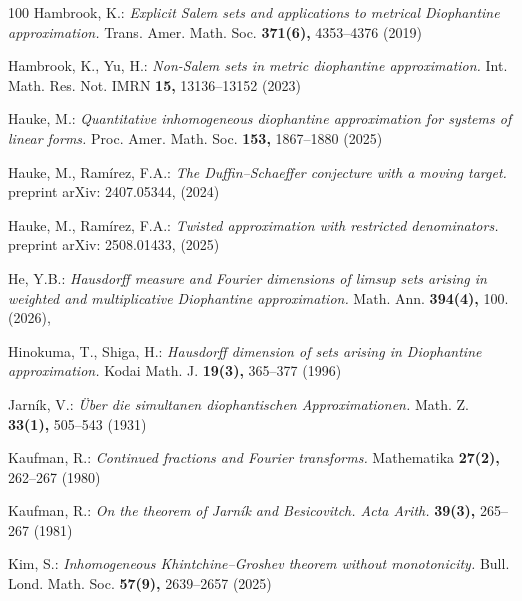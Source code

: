 \documentclass[12pt,a4paper,twoside]{article}
\begin{document}
\begin{thebibliography}{100}
Hambrook, K.:
\textit{Explicit Salem sets and applications to metrical Diophantine approximation.}
Trans. Amer. Math. Soc. {\bf 371(6),} 4353--4376  (2019)


 Hambrook, K.,   Yu, H.:
\textit{Non-Salem sets in metric diophantine approximation.}
Int. Math. Res. Not. IMRN  {\bf 15,} 13136--13152 (2023)


  Hauke, M.:
\textit{Quantitative inhomogeneous diophantine approximation for systems of linear forms.}
Proc. Amer. Math. Soc. {\bf 153,}  1867--1880 (2025)



 Hauke, M.,  Ram\'{i}rez, F.A.:
\textit{The Duffin--Schaeffer conjecture with a moving target.}
 preprint arXiv: 2407.05344, (2024)



 Hauke, M.,  Ram\'{i}rez, F.A.:
\textit{Twisted approximation with restricted denominators.}
  preprint arXiv: 2508.01433,  (2025)



  He, Y.B.:
\textit{Hausdorff measure and Fourier dimensions of limsup sets arising in weighted and multiplicative Diophantine approximation. }
Math. Ann.  {\bf 394(4),}  100. (2026),



 Hinokuma, T.,   Shiga, H.:
\textit{Hausdorff dimension of sets arising in Diophantine approximation.}
Kodai Math. J. {\bf 19(3),}   365--377  (1996)


  Jarn\'{i}k, V.:
\textit{\"{U}ber die simultanen diophantischen Approximationen. }
Math. Z.  {\bf 33(1),}  505--543  (1931)




 Kaufman, R.:
\textit{Continued fractions and Fourier transforms.}
Mathematika  {\bf 27(2),}   262–267   (1980)


Kaufman, R.:
\textit{On the theorem of Jarn\'{i}k and Besicovitch. Acta Arith.}
{\bf 39(3),} 265--267 (1981)



 Kim, S.:
\textit{Inhomogeneous Khintchine--Groshev theorem without monotonicity. }
Bull. Lond. Math. Soc.  {\bf 57(9),} 2639--2657 (2025)




\end{thebibliography}
\end{document}
